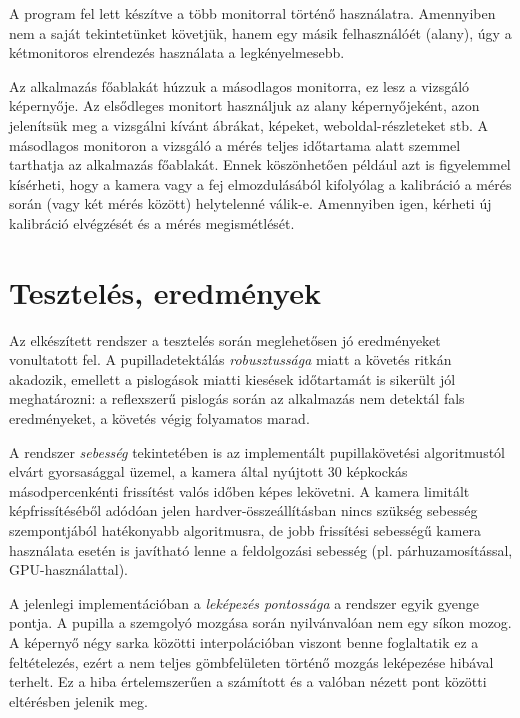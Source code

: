 A program fel lett készítve a több monitorral történő használatra. Amennyiben nem a saját tekintetünket követjük, hanem egy másik felhasználóét (alany), úgy a kétmonitoros elrendezés használata a legkényelmesebb.

Az alkalmazás főablakát húzzuk a másodlagos monitorra, ez lesz a vizsgáló képernyője. Az elsődleges monitort használjuk az alany képernyőjeként, azon jelenítsük meg a vizsgálni kívánt ábrákat, képeket, weboldal-részleteket stb. A másodlagos monitoron a vizsgáló a mérés teljes időtartama alatt szemmel tarthatja az alkalmazás főablakát. Ennek köszönhetően például azt is figyelemmel kísérheti, hogy a kamera vagy a fej elmozdulásából kifolyólag a kalibráció a mérés során (vagy két mérés között) helytelenné válik-e. Amennyiben igen, kérheti új kalibráció elvégzését és a mérés megismétlését.

\section{Tesztelés, eredmények}\label{sect:teszteles}

Az elkészített rendszer a tesztelés során meglehetősen jó eredményeket vonultatott fel. A pupilladetektálás \emph{robusztussága} miatt a követés ritkán akadozik, emellett a pislogások miatti kiesések időtartamát is sikerült jól meghatározni: a reflexszerű pislogás során az alkalmazás nem detektál fals eredményeket, a követés végig folyamatos marad.

A rendszer \emph{sebesség} tekintetében is az implementált pupillakövetési algoritmustól elvárt gyorsasággal üzemel, a kamera által nyújtott 30 képkockás másodpercenkénti frissítést valós időben képes lekövetni. A kamera limitált képfrissítéséből adódóan jelen hardver-összeállításban nincs szükség sebesség szempontjából hatékonyabb algoritmusra, de jobb frissítési sebességű kamera használata esetén is javítható lenne a feldolgozási sebesség (pl. párhuzamosítással, GPU-használattal).

A jelenlegi implementációban a \emph{leképezés pontossága} a rendszer egyik gyenge pontja. A pupilla a szemgolyó mozgása során nyilvánvalóan nem egy síkon mozog. A képernyő négy sarka közötti interpolációban viszont benne foglaltatik ez a feltételezés, ezért a nem teljes gömbfelületen történő mozgás leképezése hibával terhelt. Ez a hiba értelemszerűen a számított és a valóban nézett pont közötti eltérésben jelenik meg.

